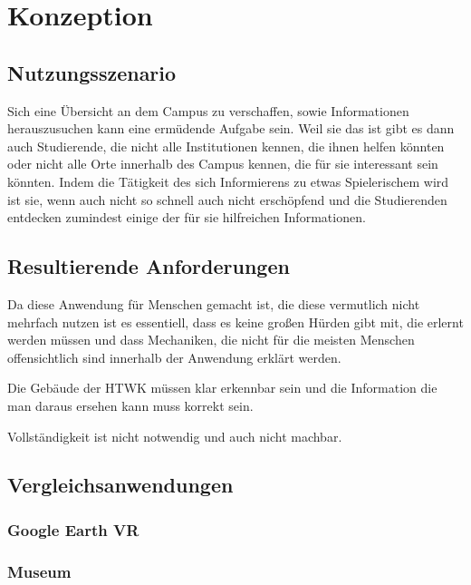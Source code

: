 \documentclass[11pt]{article} %
\begin{document}
\section{Konzeption}


\subsection{Nutzungsszenario} %

 Sich eine Übersicht an dem Campus zu verschaffen, sowie Informationen herauszusuchen kann eine ermüdende Aufgabe sein. Weil sie das ist gibt es dann auch Studierende, die nicht alle Institutionen kennen, die ihnen helfen könnten oder nicht alle Orte innerhalb des Campus kennen, die für sie interessant sein könnten. Indem die Tätigkeit des sich Informierens zu etwas Spielerischem wird ist sie, wenn auch nicht so schnell auch nicht erschöpfend und die Studierenden entdecken zumindest einige der für sie hilfreichen Informationen.


\subsection{Resultierende Anforderungen}

Da diese Anwendung für Menschen gemacht ist, die diese vermutlich nicht mehrfach nutzen ist es essentiell, dass es keine großen Hürden gibt mit, die erlernt werden müssen und dass Mechaniken, die nicht für die meisten Menschen offensichtlich sind innerhalb der Anwendung erklärt werden.

Die Gebäude der HTWK müssen klar erkennbar sein und die Information die man daraus ersehen kann muss korrekt sein.

Vollständigkeit ist nicht notwendig und auch nicht machbar.

\subsection{Vergleichsanwendungen}

\subsubsection{Google Earth VR}

\subsubsection{Museum}
\end{document}
